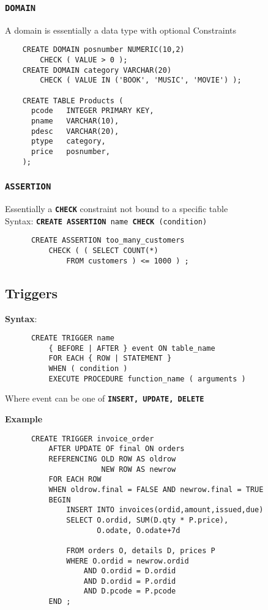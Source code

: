 \documentclass{article}
\begin{document}
\subsubsection*{\texttt{\textbf{DOMAIN}}}
A domain is essentially a data type with optional Constraints

\begin{lstlisting}
    CREATE DOMAIN posnumber NUMERIC(10,2)
        CHECK ( VALUE > 0 );
    CREATE DOMAIN category VARCHAR(20)
        CHECK ( VALUE IN ('BOOK', 'MUSIC', 'MOVIE') );

    CREATE TABLE Products (
      pcode   INTEGER PRIMARY KEY,
      pname   VARCHAR(10),
      pdesc   VARCHAR(20),
      ptype   category,
      price   posnumber,
    );
  \end{lstlisting}

\subsubsection*{\texttt{\textbf{ASSERTION}}}
Essentially a \texttt{\textbf{CHECK}} constraint not bound to a specific table\\
Syntax: \texttt{\textbf{CREATE ASSERTION} name \textbf{CHECK} (condition)}

\begin{lstlisting}
      CREATE ASSERTION too_many_customers
          CHECK ( ( SELECT COUNT(*)
              FROM customers ) <= 1000 ) ;
    \end{lstlisting}

\subsection{Triggers}
\textbf{Syntax}:
\begin{lstlisting}
      CREATE TRIGGER name
          { BEFORE | AFTER } event ON table_name
          FOR EACH { ROW | STATEMENT }
          WHEN ( condition )
          EXECUTE PROCEDURE function_name ( arguments )
    \end{lstlisting}

Where event can be one of \texttt{\textbf{INSERT, UPDATE, DELETE}}

\textbf{Example}
\begin{lstlisting}
      CREATE TRIGGER invoice_order
          AFTER UPDATE OF final ON orders
          REFERENCING OLD ROW AS oldrow
                      NEW ROW AS newrow
          FOR EACH ROW
          WHEN oldrow.final = FALSE AND newrow.final = TRUE
          BEGIN
              INSERT INTO invoices(ordid,amount,issued,due)
              SELECT O.ordid, SUM(D.qty * P.price),
                     O.odate, O.odate+7d

              FROM orders O, details D, prices P
              WHERE O.ordid = newrow.ordid
                  AND O.ordid = D.ordid
                  AND D.ordid = P.ordid
                  AND D.pcode = P.pcode
          END ;
    \end{lstlisting}
\end{document}

